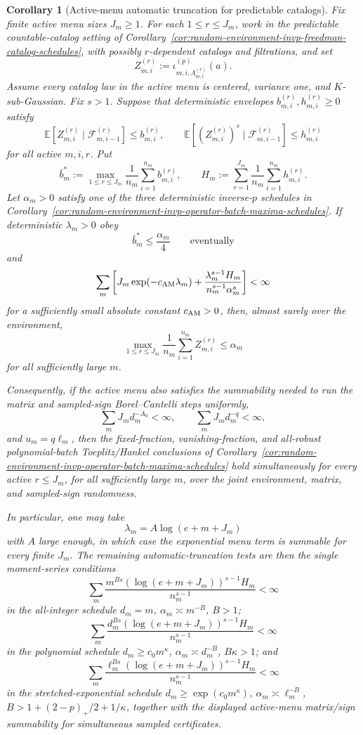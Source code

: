 \documentclass[11pt]{amsart}
\numberwithin{equation}{section}
\newtheorem{corollary}[theorem]{Corollary}
\theoremstyle{definition}
\theoremstyle{remark}
\newcommand{\Exp}{\mathbb E}
\begin{document}
\begin{corollary}[Active-menu automatic truncation for predictable catalogs]
\label{cor:random-environment-invp-active-menu-auto-truncation}
Fix finite active menu sizes \(J_m\ge1\).  For each \(1\le r\le J_m\), work in
the predictable countable-catalog setting of
Corollary~\ref{cor:random-environment-invp-freedman-catalog-schedules}, with
possibly \(r\)-dependent catalogs and filtrations, and set
\[
  Z_{m,i}^{(r)}:=\iota_{m,i,\Lambda_{m,i}^{(r)}}^{(p)}(a).
\]
Assume every catalog law in the active menu is centered, variance one, and
\(K\)-sub-Gaussian.  Fix \(s>1\).  Suppose that deterministic envelopes
\(b_{m,i}^{(r)},h_{m,i}^{(r)}\ge0\) satisfy
\[
  \Exp[Z_{m,i}^{(r)}\mid\mathcal F_{m,i-1}^{(r)}]\le b_{m,i}^{(r)},
  \qquad
  \Exp[(Z_{m,i}^{(r)})^s\mid\mathcal F_{m,i-1}^{(r)}]\le h_{m,i}^{(r)}
\]
for all active \(m,i,r\).  Put
\[
  \bar b_m^*:=\max_{1\le r\le J_m}
    \frac1{n_m}\sum_{i=1}^{n_m}b_{m,i}^{(r)},
  \qquad
  H_m:=\sum_{r=1}^{J_m}\frac1{n_m}
    \sum_{i=1}^{n_m}h_{m,i}^{(r)} .
\]
Let \(\alpha_m>0\) satisfy one of the three deterministic inverse-\(p\)
schedules in
Corollary~\ref{cor:random-environment-invp-operator-batch-maxima-schedules}.
If deterministic \(\lambda_m>0\) obey
\[
  \bar b_m^*\le\frac{\alpha_m}{4}
  \qquad\text{eventually}
\]
and
\[
  \sum_m
  \left[
    J_m\exp(-c_{\rm AM}\lambda_m)
    +
    \frac{\lambda_m^{s-1}H_m}{n_m^{s-1}\alpha_m^s}
  \right]<\infty
\]
for a sufficiently small absolute constant \(c_{\rm AM}>0\), then, almost
surely over the environment,
\[
  \max_{1\le r\le J_m}
  \frac1{n_m}\sum_{i=1}^{n_m} Z_{m,i}^{(r)}
  \le \alpha_m
\]
for all sufficiently large \(m\).

Consequently, if the active menu also satisfies the summability needed to run
the matrix and sampled-sign Borel--Cantelli steps uniformly,
\[
  \sum_m J_m d_m^{-A_0}<\infty,
  \qquad
  \sum_m J_m d_m^{-q}<\infty,
\]
and \(u_m=q\ell_m\), then the fixed-fraction, vanishing-fraction, and
all-robust polynomial-batch Toeplitz/Hankel conclusions of
Corollary~\ref{cor:random-environment-invp-operator-batch-maxima-schedules}
hold simultaneously for every active \(r\le J_m\), for all sufficiently large
\(m\), over the joint environment, matrix, and sampled-sign randomness.

In particular, one may take
\[
  \lambda_m=A\log(e+m+J_m)
\]
with \(A\) large enough, in which case the exponential menu term is summable for
every finite \(J_m\).  The remaining automatic-truncation tests are then the
single moment-series conditions
\[
  \sum_m
  \frac{m^{Bs}(\log(e+m+J_m))^{s-1}H_m}{n_m^{s-1}}<\infty
\]
in the all-integer schedule \(d_m=m\), \(\alpha_m\asymp m^{-B}\), \(B>1\);
\[
  \sum_m
  \frac{d_m^{Bs}(\log(e+m+J_m))^{s-1}H_m}{n_m^{s-1}}<\infty
\]
in the polynomial schedule \(d_m\ge c_0m^\kappa\),
\(\alpha_m\asymp d_m^{-B}\), \(B\kappa>1\); and
\[
  \sum_m
  \frac{\ell_m^{Bs}(\log(e+m+J_m))^{s-1}H_m}{n_m^{s-1}}<\infty
\]
in the stretched-exponential schedule
\(d_m\ge\exp(c_0m^\kappa)\), \(\alpha_m\asymp\ell_m^{-B}\),
\(B>1+(2-p)_+/2+1/\kappa\), together with the displayed active-menu
matrix/sign summability for simultaneous sampled certificates.
\end{corollary}
\end{document}
